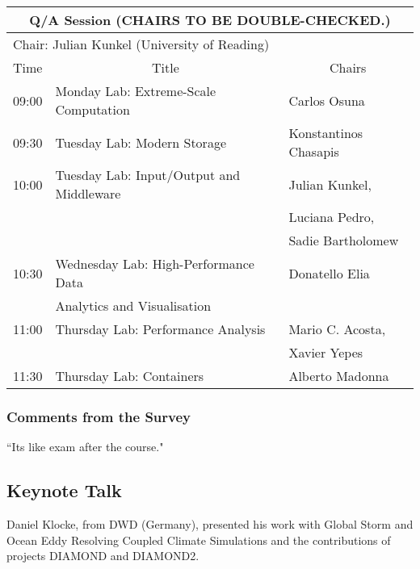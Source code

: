 \begin{table}[H]
\begin{center}
\begin{tabular}{|l|l|l|}
\hline
\multicolumn{3}{|c|}{\textbf{Q/A Session (CHAIRS TO BE DOUBLE-CHECKED.)}} \\ \hline
\multicolumn{3}{|l|}{Chair: Julian Kunkel (University of Reading)} \\ \hline \hline
Time & \multicolumn{1}{c|}{Title} & \multicolumn{1}{c|}{Chairs} \\ \hline \hline
09:00 & Monday Lab: Extreme-Scale Computation & Carlos Osuna \\ \hline
09:30 & Tuesday Lab: Modern Storage & Konstantinos Chasapis \\ \hline
10:00 & Tuesday Lab: Input/Output and Middleware  & Julian Kunkel, \\
      &                                           & Luciana Pedro, \\
      &                                           & Sadie Bartholomew \\ \hline
10:30 & Wednesday Lab: High-Performance Data  & Donatello Elia \\
      & Analytics and Visualisation           &  \\ \hline
11:00 & Thursday Lab: Performance Analysis & Mario C. Acosta, \\
      &                                    & Xavier Yepes \\ \hline
11:30 & Thursday Lab: Containers & Alberto Madonna \\ \hline
\hline
\end{tabular}
\end{center}
\end{table}

\subsubsection{Comments from the Survey}

``Its like exam after the course."

\subsection{Keynote Talk}
\label{sec:kt}

Daniel Klocke, from DWD (Germany), presented his work with Global Storm and Ocean Eddy Resolving Coupled Climate Simulations and the contributions of projects DIAMOND and DIAMOND2.

